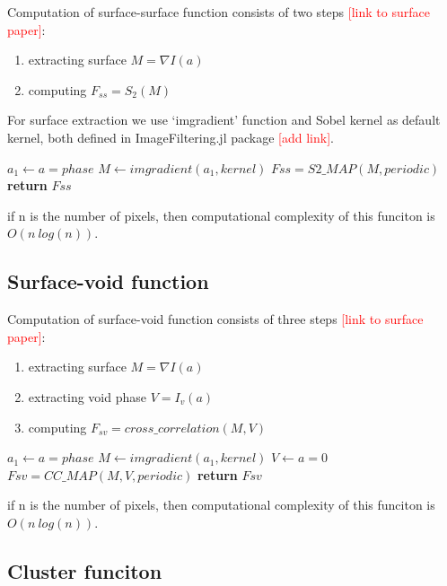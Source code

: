 \documentclass[reprint,amsmath,amssymb,aps,pre]{revtex4-1}
\begin{document}
Computation of surface-surface function consists of two steps 
\textcolor{red}{[link to surface paper]}:
\begin{enumerate}
  \item extracting surface $M = \nabla I(a)$
  \item computing $F_{ss} = S_2(M)$
\end{enumerate}

For surface extraction we use `imgradient' function
and Sobel kernel as default kernel, 
both defined in ImageFiltering.jl package \textcolor{red}{[add link]}.

\begin{algorithmic}[1]
    \State $a_1 \gets a = phase$
    \State $M \gets imgradient(a_1, kernel)$
    \State $Fss = S2\_MAP(M, periodic)$
    \State \textbf{return} $Fss$
  \EndProcedure
\end{algorithmic}

if n is the number of pixels, then computational complexity
of this funciton is $O(n\ log(n))$.

\subsection{Surface-void function}


Computation of surface-void function consists of three steps 
\textcolor{red}{[link to surface paper]}:
\begin{enumerate}
  \item extracting surface $M = \nabla I(a)$
  \item extracting void phase $V = I_v(a)$
  \item computing $F_{sv} = cross\_correlation(M, V)$
\end{enumerate}

\begin{algorithmic}[1]
    \State $a_1 \gets a = phase$
    \State $M \gets imgradient(a_1, kernel)$
    \State $V \gets a = 0$
    \State $Fsv = CC\_MAP(M, V, periodic)$
    \State \textbf{return} $Fsv$
  \EndProcedure
\end{algorithmic}

if n is the number of pixels, then computational complexity
of this funciton is $O(n\ log(n))$.

\subsection{Cluster funciton}
\end{document}
